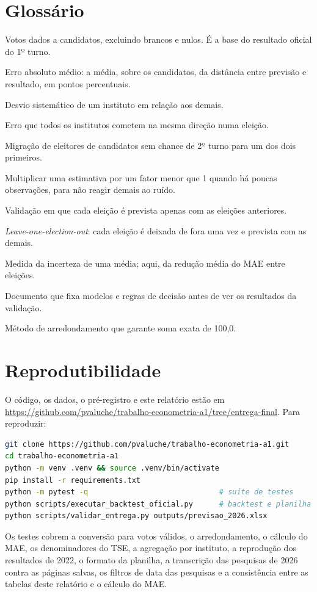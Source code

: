 \documentclass[10.5pt,a4paper]{article}
\begin{document}
\section{Glossário}
\begin{description}[leftmargin=1em,itemsep=3pt]
\item[Votos válidos] Votos dados a candidatos, excluindo brancos e nulos. É a base do resultado oficial do 1º turno.
\item[MAE] Erro absoluto médio: a média, sobre os candidatos, da distância entre previsão e resultado, em pontos percentuais.
\item[\emph{House effect}] Desvio sistemático de um instituto em relação aos demais.
\item[Viés comum] Erro que todos os institutos cometem na mesma direção numa eleição.
\item[Voto útil] Migração de eleitores de candidatos sem chance de 2º turno para um dos dois primeiros.
\item[Encolhimento] Multiplicar uma estimativa por um fator menor que 1 quando há poucas observações, para não reagir demais ao ruído.
\item[\emph{Expanding window}] Validação em que cada eleição é prevista apenas com as eleições anteriores.
\item[LOEO] \emph{Leave-one-election-out}: cada eleição é deixada de fora uma vez e prevista com as demais.
\item[Erro-padrão (EP)] Medida da incerteza de uma média; aqui, da redução média do MAE entre eleições.
\item[Pré-registro] Documento que fixa modelos e regras de decisão antes de ver os resultados da validação.
\item[Maiores restos] Método de arredondamento que garante soma exata de 100,0.
\end{description}

\section{Reprodutibilidade}
O código, os dados, o pré-registro e este relatório estão em \url{https://github.com/pvaluche/trabalho-econometria-a1/tree/entrega-final}. Para reproduzir:
\begin{lstlisting}[language=bash]
git clone https://github.com/pvaluche/trabalho-econometria-a1.git
cd trabalho-econometria-a1
python -m venv .venv && source .venv/bin/activate
pip install -r requirements.txt
python -m pytest -q                              # suíte de testes
python scripts/executar_backtest_oficial.py      # backtest e planilha
python scripts/validar_entrega.py outputs/previsao_2026.xlsx
\end{lstlisting}
Os testes cobrem a conversão para votos válidos, o arredondamento, o cálculo do MAE, os denominadores do TSE, a agregação por instituto, a reprodução dos resultados de 2022, o formato da planilha, a transcrição das pesquisas de 2026 contra as páginas salvas, os filtros de data das pesquisas e a consistência entre as tabelas deste relatório e o cálculo do MAE.
\end{document}
